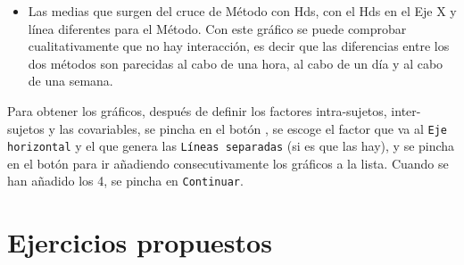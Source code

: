 \begin{enumerate}
\begin{enumerate}
\begin{indicacion}
{\begin{itemize}
\item Las medias que surgen del cruce de Método con Hds, con el Hds en el Eje X y línea diferentes para el Método. Con este gráfico se puede comprobar cualitativamente que no hay interacción, es decir que las diferencias entre los dos métodos son parecidas al cabo de una hora, al cabo de un día y al cabo de una semana.


\end{itemize}

Para obtener los gráficos, después de definir los factores intra-sujetos, inter-sujetos y las covariables, se pincha en el botón , se escoge el factor que va al \texttt{Eje horizontal} y el que genera las \texttt{Líneas separadas} (si es que las hay), y se pincha en el botón  para ir añadiendo consecutivamente los gráficos a la lista. Cuando se han añadido los 4, se pincha en \texttt{Continuar}.


}
\end{indicacion}

\end{enumerate}
\end{enumerate}

\section{Ejercicios propuestos}

